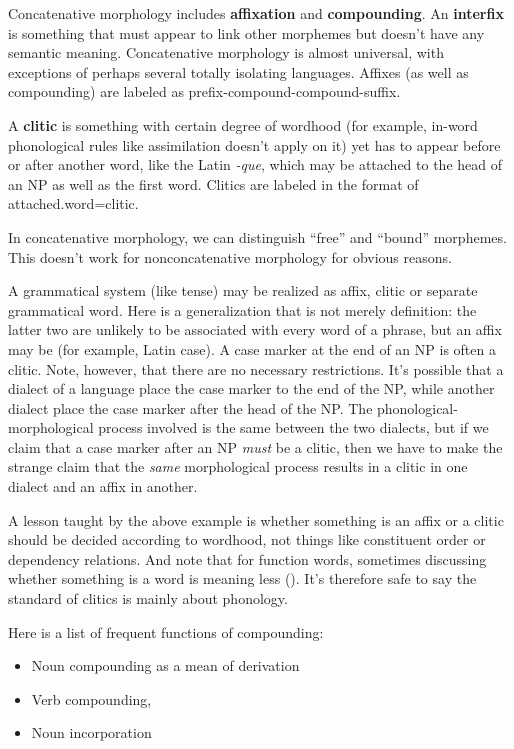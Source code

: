 \documentclass[UTF8, a4paper, oneside, scheme=plain]{ctexart}
\newcommand*{\concept}[1]{\textbf{#1}}
\newcommand*{\corpus}[1]{\emph{#1}}
\begin{document}
Concatenative morphology includes \concept{affixation} and \concept{compounding}.
An \concept{interfix} is something that must appear to link other morphemes 
but doesn't have any semantic meaning.
Concatenative morphology is almost universal, 
with exceptions of perhaps several totally isolating languages.
Affixes (as well as compounding) are labeled as prefix-compound-compound-suffix.

A \concept{clitic} is something with certain degree of wordhood 
(for example, in-word phonological rules like assimilation doesn't apply on it)
yet has to appear before or after another word, 
like the Latin \corpus{-que}, which may be attached to the head of an NP as well as the first word.
Clitics are labeled in the format of attached.word=clitic. 

In concatenative morphology, we can distinguish ``free'' and ``bound'' morphemes. 
This doesn't work for nonconcatenative morphology for obvious reasons.

A grammatical system (like tense) may be realized as affix, clitic or separate grammatical word. 
Here is a generalization that is not merely definition:
the latter two are unlikely to be associated with every word of a phrase, 
but an affix may be (for example, Latin case). 
A case marker at the end of an NP is often a clitic. 
Note, however, that there are no necessary restrictions. 
It's possible that a dialect of a language place the case marker to the end of the NP, 
while another dialect place the case marker after the head of the NP. 
The phonological-morphological process involved is the same between the two dialects, 
but if we claim that a case marker after an NP \emph{must} be a clitic, 
then we have to make the strange claim that 
the \emph{same} morphological process results in a clitic in one dialect and an affix in another.

A lesson taught by the above example is 
whether something is an affix or a clitic should be decided according to wordhood, 
not things like constituent order or dependency relations. 
And note that for function words,
sometimes discussing whether something is a word is meaning less ().
It's therefore safe to say the standard of clitics is mainly about phonology.

Here is a list of frequent functions of compounding:
\begin{itemize}
    \item Noun compounding as a mean of derivation
    \item Verb compounding, 
    \item Noun incorporation
\end{itemize} 
\end{document}
